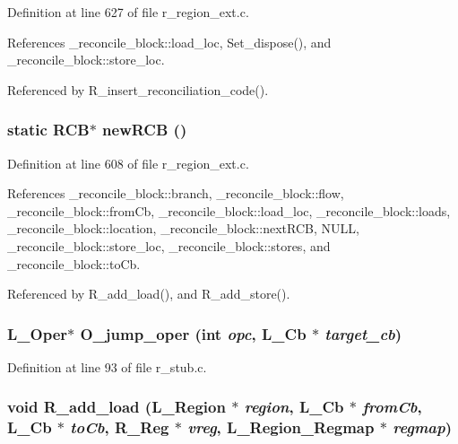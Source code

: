 Definition at line 627 of file r\_\-region\_\-ext.c.

References \_\-reconcile\_\-block::load\_\-loc, Set\_\-dispose(), and \_\-reconcile\_\-block::store\_\-loc.

Referenced by R\_\-insert\_\-reconciliation\_\-code().
\subsubsection{\setlength{\rightskip}{0pt plus 5cm}static \bf{RCB}$\ast$ new\-RCB ()\hspace{0.3cm}{\tt  [static]}}\label{r__region__ext_8c_c40182d709062dead8fbedb703e540a1}




Definition at line 608 of file r\_\-region\_\-ext.c.

References \_\-reconcile\_\-block::branch, \_\-reconcile\_\-block::flow, \_\-reconcile\_\-block::from\-Cb, \_\-reconcile\_\-block::load\_\-loc, \_\-reconcile\_\-block::loads, \_\-reconcile\_\-block::location, \_\-reconcile\_\-block::next\-RCB, NULL, \_\-reconcile\_\-block::store\_\-loc, \_\-reconcile\_\-block::stores, and \_\-reconcile\_\-block::to\-Cb.

Referenced by R\_\-add\_\-load(), and R\_\-add\_\-store().
\subsubsection{\setlength{\rightskip}{0pt plus 5cm}L\_\-Oper$\ast$ O\_\-jump\_\-oper (int {\em opc}, L\_\-Cb $\ast$ {\em target\_\-cb})}\label{r__region__ext_8c_7242989af20a9cec7626f6030b0a6583}




Definition at line 93 of file r\_\-stub.c.
\subsubsection{\setlength{\rightskip}{0pt plus 5cm}void R\_\-add\_\-load (L\_\-Region $\ast$ {\em region}, L\_\-Cb $\ast$ {\em from\-Cb}, L\_\-Cb $\ast$ {\em to\-Cb}, \bf{R\_\-Reg} $\ast$ {\em vreg}, L\_\-Region\_\-Regmap $\ast$ {\em regmap})}\label{r__region__ext_8c_d77e410507946cbea3e5146883f47c28}




